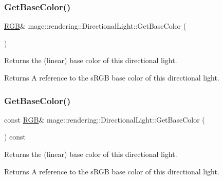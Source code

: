 \subsubsection{\texorpdfstring{Get\+Base\+Color()}{GetBaseColor()}\hspace{0.1cm}{\footnotesize\ttfamily [1/2]}}
{\footnotesize\ttfamily \mbox{\hyperlink{structmage_1_1_r_g_b}{R\+GB}}\& mage\+::rendering\+::\+Directional\+Light\+::\+Get\+Base\+Color (\begin{DoxyParamCaption}{ }\end{DoxyParamCaption})\hspace{0.3cm}{\ttfamily [noexcept]}}

Returns the (linear) base color of this directional light.

\begin{DoxyReturn}{Returns}
A reference to the s\+R\+GB base color of this directional light. 
\end{DoxyReturn}
\mbox{\label{classmage_1_1rendering_1_1_directional_light_aca3e27ba1d32b1146d3250827c1efb5f}} 
\subsubsection{\texorpdfstring{Get\+Base\+Color()}{GetBaseColor()}\hspace{0.1cm}{\footnotesize\ttfamily [2/2]}}
{\footnotesize\ttfamily const \mbox{\hyperlink{structmage_1_1_r_g_b}{R\+GB}}\& mage\+::rendering\+::\+Directional\+Light\+::\+Get\+Base\+Color (\begin{DoxyParamCaption}{ }\end{DoxyParamCaption}) const\hspace{0.3cm}{\ttfamily [noexcept]}}

Returns the (linear) base color of this directional light.

\begin{DoxyReturn}{Returns}
A reference to the s\+R\+GB base color of this directional light. 
\end{DoxyReturn}
\mbox{\label{classmage_1_1rendering_1_1_directional_light_a1cba2b0099366af146c3ccf364946bf8}} 
